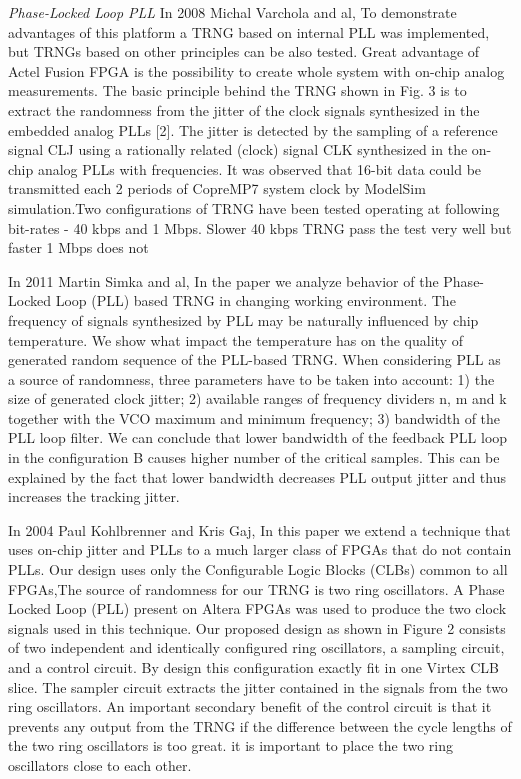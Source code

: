 \textit{Phase-Locked Loop PLL}
In 2008 Michal Varchola and al, To demonstrate advantages of this platform a TRNG based on internal PLL was implemented, but TRNGs based on other principles can be also tested. Great advantage of Actel Fusion FPGA is the possibility to create whole system with on-chip analog measurements. The basic principle behind the TRNG shown in Fig. 3 is to extract the randomness from the jitter of the clock signals synthesized in the embedded analog PLLs [2]. The jitter is detected by the sampling of a reference signal CLJ using a rationally related (clock) signal CLK synthesized in the on-chip analog PLLs with frequencies. It was observed that 16-bit data could be transmitted each 2 periods of CopreMP7 system clock by ModelSim simulation.Two configurations of TRNG have been tested operating at following bit-rates - 40 kbps and 1 Mbps. Slower 40 kbps TRNG pass the test very well but faster 1 Mbps does not

In 2011 Martin Simka and al, In the paper we analyze behavior of the Phase-Locked Loop (PLL) based TRNG in changing working environment. The frequency of signals synthesized by PLL may be naturally influenced by chip temperature. We show what impact the temperature has on the quality of generated random sequence of the PLL-based TRNG. When considering PLL as a source of randomness, three parameters have to be taken into account: 1) the size of generated clock jitter; 2) available ranges of frequency dividers n, m and k together with the VCO maximum and minimum frequency; 3) bandwidth of the PLL loop filter. We can conclude that lower bandwidth of the feedback PLL loop in the configuration B causes higher number of the critical samples. This can be explained by the fact that lower bandwidth decreases PLL output jitter and thus increases the tracking jitter. 

In 2004 Paul Kohlbrenner and Kris Gaj, In this paper we extend a technique that uses on-chip jitter and
PLLs to a much larger class of FPGAs that do not contain PLLs. Our design uses only the Configurable Logic Blocks (CLBs) common to all FPGAs,The source of randomness for our TRNG is two ring oscillators. A Phase Locked Loop (PLL) present on Altera FPGAs was used to produce the two clock signals used in this technique. Our proposed design as shown in Figure 2 consists of two independent and identically configured ring oscillators, a sampling circuit, and a control circuit. By design this configuration exactly fit in one Virtex CLB slice. The sampler circuit extracts the jitter contained in the signals from the two ring oscillators. An important secondary benefit of the control circuit is that it prevents any output from the TRNG if the difference between the cycle lengths of the two ring oscillators is too great. it is important to place the two ring oscillators close to each other. 

